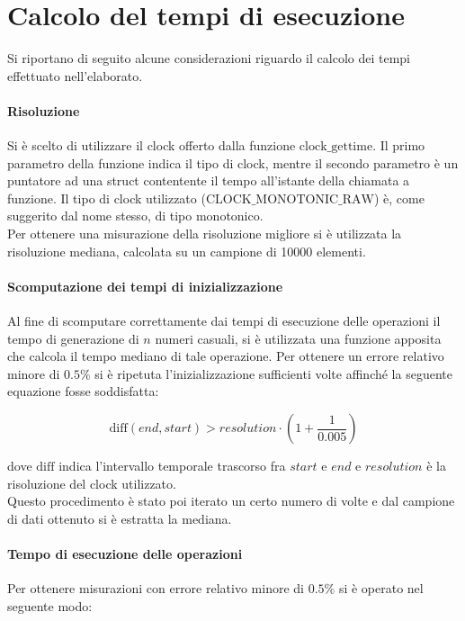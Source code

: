 \documentclass{article}
\begin{document}
	\newpage
	\section{Calcolo del tempi di esecuzione}	
	\label{section:exec}
	Si riportano di seguito alcune	considerazioni riguardo il calcolo dei tempi effettuato nell'elaborato.
	
	\paragraph{Risoluzione}
	Si è scelto di utilizzare il clock offerto dalla funzione $\text{clock\_gettime}$. Il primo parametro della funzione indica il tipo di clock, mentre il secondo parametro è un puntatore ad una struct contentente il tempo all'istante della chiamata a funzione. Il tipo di clock utilizzato ($\text{CLOCK\_MONOTONIC\_RAW}$) è, come suggerito dal nome stesso, di tipo monotonico. \\ Per ottenere una misurazione della risoluzione migliore si è utilizzata la risoluzione mediana, calcolata su un campione di 10000 elementi.
	
	\paragraph{Scomputazione dei tempi di inizializzazione}
	Al fine di scomputare correttamente dai tempi di esecuzione delle operazioni il tempo di generazione di $n$ numeri casuali, si è utilizzata una funzione apposita che calcola il tempo mediano di tale operazione. Per ottenere un errore relativo minore di $0.5\%$ si è ripetuta l'inizializzazione sufficienti volte affinché la seguente equazione fosse soddisfatta:
	
	\[
		\text{diff}\left(end, start\right) > resolution \cdot \left(1+\frac{1}{0.005}\right)  
	\]
	
	dove $\text{diff}$ indica l'intervallo temporale trascorso fra $start$ e $end$ e $resolution$ è la risoluzione del clock utilizzato. \\ Questo procedimento è stato poi iterato un certo numero di volte e dal campione di dati ottenuto si è estratta la mediana.
	
	\paragraph{Tempo di esecuzione delle operazioni}
	Per ottenere misurazioni con errore relativo minore di $0.5\%$ si è operato nel seguente modo:
	
\end{document}
